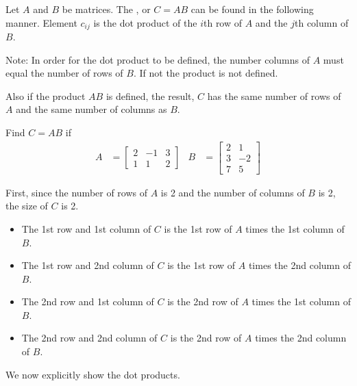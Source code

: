 \begin{definition}
Let $A$ and $B$ be matrices.  The , or $C=AB$ can be found in the following manner.  Element $c_{ij}$ is the dot product of the $i$th row of $A$ and the $j$th column of $B$.

Note:  In order for the dot product to be defined, the number columns of $A$ must equal the number of rows of $B$.  If not the product is not defined.
\end{definition}

Also if the product $AB$ is defined, the result, $C$ has the same number of rows of $A$ and the same number of columns as $B$.

\begin{example}
Find $C=AB$ if
%
\begin{align*}
A & = \begin{bmatrix}
2 & -1 & 3 \\ 1 & 1 & 2
\end{bmatrix}
&
B & = \begin{bmatrix}
2 & 1 \\ 3 & -2 \\ 7 & 5
\end{bmatrix}
\end{align*}

\solution

First, since the number of rows of $A$ is 2 and the number of columns of $B$ is 2, the size of $C$ is 2.

\begin{itemize}
\item The 1st row and 1st column of $C$ is the 1st row of $A$ times the 1st column of $B$.
\item The 1st row and 2nd column of $C$ is the 1st row of $A$ times the 2nd column of $B$.
\item The 2nd row and 1st column of $C$ is the 2nd row of $A$ times the 1st column of $B$.
\item The 2nd row and 2nd column of $C$ is the 2nd row of $A$ times the 2nd column of $B$.

\end{itemize}

We now explicitly show the dot products.


\end{example}
